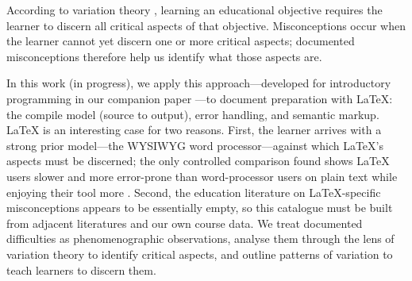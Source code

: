 According to variation theory \autocite[See][]{NCOL}, learning an educational
objective requires the learner to discern all critical aspects of that
objective. Misconceptions occur when the learner cannot yet discern one or
more critical aspects; documented misconceptions therefore help us identify
what those aspects are.

In this work (in progress), we apply this approach---developed for
introductory programming in our companion paper
\autocite{VTProgMisconceptions}---to document preparation with LaTeX: the
compile model (source to output), error handling, and semantic markup.
LaTeX is an interesting case for two reasons. First, the learner arrives
with a strong prior model---the WYSIWYG word processor---against which
LaTeX's aspects must be discerned; the only controlled comparison found
shows LaTeX users slower and more error-prone than word-processor users on
plain text while enjoying their tool more \autocite{Knauff2014Latex}.
Second, the education literature on LaTeX-specific misconceptions appears
to be essentially empty, so this catalogue must be built from adjacent
literatures and our own course data. We treat documented difficulties as
phenomenographic observations, analyse them through the lens of variation
theory to identify critical aspects, and outline patterns of variation to
teach learners to discern them.
